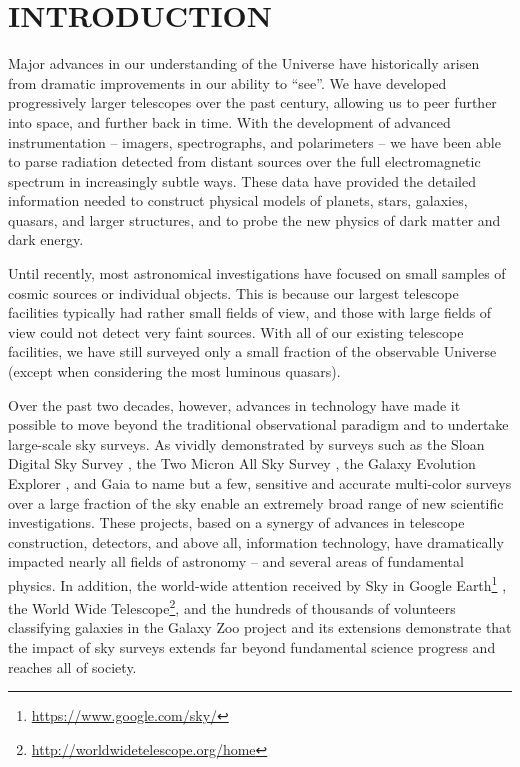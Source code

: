 \section{INTRODUCTION}

Major advances in our understanding of the Universe have historically arisen
from dramatic improvements in our ability to ``see''. We have developed
progressively larger telescopes over the past century, allowing us
to peer further into space, and further back in time. With the development of
advanced instrumentation -- imagers, spectrographs, and polarimeters -- we
have been able to parse radiation detected from distant sources over the
full electromagnetic spectrum in increasingly subtle ways.
These data have provided the detailed information needed to construct physical
models of planets, stars, galaxies, quasars, and larger structures, and to probe the
new physics of dark matter and dark energy.

Until recently, most astronomical investigations have focused on small samples
of cosmic sources or individual objects. This is because our largest telescope
facilities typically had rather small fields of view, and those with large
fields of view could not detect very faint sources. With all of our existing
telescope facilities, we have still surveyed only a small fraction of the
observable Universe (except when considering the most luminous quasars).

Over the past two decades, however, advances in technology have made it possible to
move beyond the traditional observational paradigm and to undertake large-scale
sky surveys. As vividly demonstrated by surveys such as the Sloan Digital Sky
Survey \citep[SDSS;][]{2000AJ....120.1579Y}, the Two Micron All Sky Survey \citep[2MASS;][]{2006AJ....131.1163S},
the Galaxy Evolution Explorer \citep[GALEX;][]{2005ApJ...619L...1M},
and Gaia \citep{2016A&A...595A...2G} to name but a few, sensitive and accurate
multi-color surveys over a large fraction of the sky enable an extremely broad range of
new scientific investigations. These projects, based on a synergy of advances in
telescope construction, detectors, and above all, information technology,
have dramatically impacted nearly all fields of astronomy
-- and several areas of fundamental physics. In addition, the world-wide attention
received by Sky in Google Earth\footnote{\url{https://www.google.com/sky/}}
\citep{2007arXiv0709.0752S}, the World Wide Telescope\footnote{\url{http://worldwidetelescope.org/home}},
and the hundreds of thousands of volunteers
classifying galaxies in the Galaxy Zoo project \citep{2011MNRAS.410..166L}
and its extensions demonstrate that the impact of sky surveys extends
far beyond fundamental science progress and reaches all of society.

